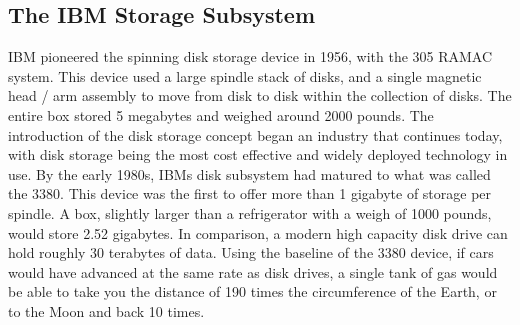 \documentclass[
	a4paper, %
	10pt, %
	unnumberedsections, %
	twoside, %
]{LTJournalArticle}
\begin{document}
\subsection{The IBM Storage Subsystem }
IBM pioneered the spinning disk storage device in 1956, with the 305 RAMAC system. This device
used a large spindle stack of disks, and a single magnetic head / arm assembly to move from disk to disk 
within the collection of disks. The entire box stored 5 megabytes and weighed around 2000 pounds.
The introduction of the disk storage concept began an industry that continues today, with disk storage 
being the most cost effective and widely deployed technology in use. By the early 1980s, IBMs disk 
subsystem had matured to what was called the 3380. This device was the first to offer more than 1 gigabyte
of storage per spindle. A box, slightly larger than a refrigerator with a weigh of 1000 pounds, would
store 2.52 gigabytes. In comparison, a modern high capacity disk drive can hold roughly 30 terabytes
of data. Using the baseline of the 3380 device, if cars would have advanced at the same rate as disk drives, a single tank of gas would
be able to take you the distance of 190 times the circumference of the Earth, or to the Moon and 
back 10 times. 
\end{document}
